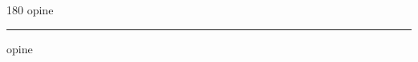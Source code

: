 
\begin{frame}
\begin{center}
\begin{turn}{180}
{\fontsize{2.5cm}{1em}\selectfont opine}
\end{turn}
\vspace{1em}\par  
\hrule
\vspace{1em}\par  
{\fontsize{2.5cm}{1em}\selectfont opine}
\end{center}
\end{frame}
